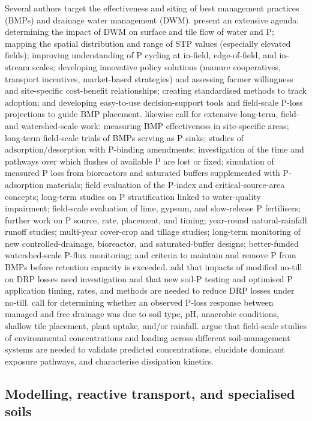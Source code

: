 \documentclass[11pt]{article}
\begin{document}
Several authors target the effectiveness and siting of best management practices (BMPs) and drainage water management (DWM). \textcite{Wilson2019} present an extensive agenda: determining the impact of DWM on surface and tile flow of water and P; mapping the spatial distribution and range of STP values (especially elevated fields); improving understanding of P cycling at in-field, edge-of-field, and in-stream scales; developing innovative policy solutions (manure cooperatives, transport incentives, market-based strategies) and assessing farmer willingness and site-specific cost-benefit relationships; creating standardised methods to track adoption; and developing easy-to-use decision-support tools and field-scale P-loss projections to guide BMP placement. \textcite{Singh2020c} likewise call for extensive long-term, field- and watershed-scale work: measuring BMP effectiveness in site-specific areas; long-term field-scale trials of BMPs serving as P sinks; studies of adsorption/desorption with P-binding amendments; investigation of the time and pathways over which flushes of available P are lost or fixed; simulation of measured P loss from bioreactors and saturated buffers supplemented with P-adsorption materials; field evaluation of the P-index and critical-source-area concepts; long-term studies on P stratification linked to water-quality impairment; field-scale evaluation of lime, gypsum, and slow-release P fertilisers; further work on P source, rate, placement, and timing; year-round natural-rainfall runoff studies; multi-year cover-crop and tillage studies; long-term monitoring of new controlled-drainage, bioreactor, and saturated-buffer designs; better-funded watershed-scale P-flux monitoring; and criteria to maintain and remove P from BMPs before retention capacity is exceeded. \textcite{Zhang2017} add that impacts of modified no-till on DRP losses need investigation and that new soil-P testing and optimised P application timing, rates, and methods are needed to reduce DRP losses under no-till. \textcite{Nash2015c} call for determining whether an observed P-loss response between managed and free drainage was due to soil type, pH, anaerobic conditions, shallow tile placement, plant uptake, and/or rainfall. \textcite{Gottschall2012} argue that field-scale studies of environmental concentrations and loading across different soil-management systems are needed to validate predicted concentrations, elucidate dominant exposure pathways, and characterise dissipation kinetics.

\subsection{Modelling, reactive transport, and specialised soils}
\end{document}
